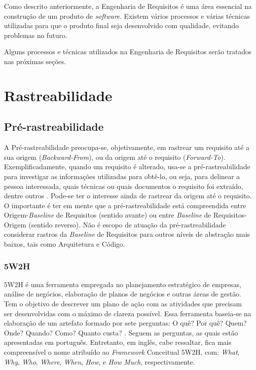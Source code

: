 Como descrito anteriormente, a Engenharia de Requisitos é uma área essencial na construção de um produto de \textit{software}. Existem vários processos e várias técnicas utilizadas para que o produto final seja desenvolvido com qualidade, evitando problemas no futuro.

Alguns processos e técnicas utilizados na Engenharia de Requisitos serão tratados nas próximas seções.

\section{Rastreabilidade}

\label{sec:rastreabilidade}

\subsection{Pré-rastreabilidade}

\label{sec:pre-rastreabilidade}

A Pré-rastreabilidade preocupa-se, objetivamente, em rastrear um requisito até a sua origem (\textit{Backward-From}), ou da origem até o requisito (\textit{Forward-To}). Exemplificadamente, quando um requisito é alterado, usa-se a pré-rastreabilidade para investigar as informações utilizadas para obtê-lo, ou seja, para delinear a pessoa interessada, quais técnicas ou quais documentos o requisito foi extraído, dentre outros \cite{pinheiro2004requirements}. Pode-se ter o interesse ainda de rastrear da origem até o requisito. O importante é ter em mente que a pré-rastreabilidade está compreendida entre Origem-\textit{Baseline} de Requisitos (sentido avante) ou entre \textit{Baseline} de Requisitos-Origem (sentido reverso). Não é escopo de atuação da pré-rastreabilidade considerar rastros da \textit{Baseline} de Requisitos para outros níveis de abstração mais baixos, tais como Arquitetura e Código.

\subsubsection{5W2H}

\label{sec:5w2h}

5W2H é uma ferramenta empregada no planejamento estratégico de empresas, análise de negócios, elaboração de planos de negócios e outras áreas de gestão. Tem o objetivo de descrever um plano de ação com as atividades que precisam ser desenvolvidas com o máximo de clareza possível. Essa ferramenta baseia-se na elaboração de um artefato formado por sete perguntas: O quê? Por quê? Quem? Onde? Quando? Como? Quanto custa? \cite{rabuskeuso}. Seguem as perguntas, as quais estão apresentadas em português. Entretanto, em inglês, cabe ressaltar, fica mais compreensível o nome atribuído ao \textit{Framework} Conceitual 5W2H, com: \textit{What}, \textit{Why}, \textit{Who}, \textit{Where}, \textit{When}, \textit{How}, e \textit{How Much}, respectivamente.

